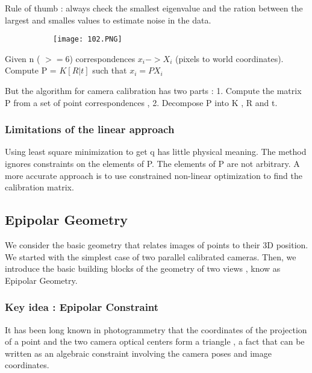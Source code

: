 \documentclass{article}
\begin{document}
Rule of thumb : always check the smallest eigenvalue and the ration between the largest and smalles values to estimate noise in the data.

\vspace{50mm}

\begin{figure}[ht!]
  \centering
  \begin{subfigure}[b]{0.4\linewidth}
    \texttt{[image: 102.PNG]}
  \end{subfigure}
\end{figure}

Given n ( $>= 6$) correspondences $x_i -> X_i$ (pixels to world coordinates).
Compute P = $K [R | t]$ such that $x_i = PX_i$

But the algorithm for camera calibration has two parts : 1. Compute the matrix P from a set of point correspondences , 2. Decompose P into K , R and t.

\subsubsection{Limitations of the linear approach}

Using least square minimization to get q has little physical meaning.
The method ignores constraints on the elements of P. The elements of P are not arbitrary. A more accurate approach is to use constrained non-linear optimization to find the calibration matrix.

\subsection{Epipolar Geometry}

We consider the basic geometry that relates images of points to their 3D position.
We started with the simplest case of two parallel calibrated cameras.
Then, we introduce the basic building blocks of the geometry of two views , know as Epipolar Geometry.

\subsubsection{Key idea : Epipolar Constraint}

It has been long known in photogrammetry that the coordinates of the projection of a point and the two camera optical centers form a triangle , a fact that can be written as an algebraic constraint involving the camera poses and image coordinates.
\end{document}
